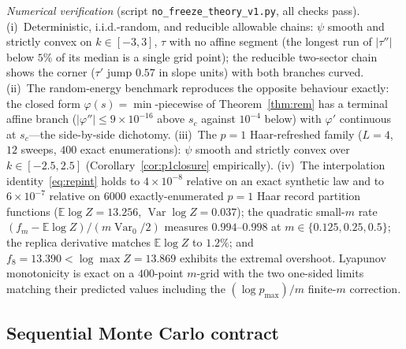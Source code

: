 \documentclass[aps,prx,reprint,superscriptaddress,nobibnotes,longbibliography]{revtex4-2}
\theoremstyle{remark}
\newcommand{\E}{\mathbb E}
\begin{document}
\emph{Numerical verification} (script \texttt{no\_freeze\_theory\_v1.py},
all checks pass).  (i)~Deterministic, i.i.d.-random, and reducible
allowable chains: $\psi$ smooth and strictly convex on
$k\in[-3,3]$, $\tau$ with no affine segment (the longest run of
$|\tau''|$ below $5\%$ of its median is a single grid point); the
reducible two-sector chain shows the corner ($\tau'$ jump $0.57$ in slope
units) with both branches curved.  (ii)~The random-energy benchmark
reproduces the opposite behaviour exactly: the closed form
$\varphi(s)=\min$-piecewise of Theorem~\ref{thm:rem} has a terminal
affine branch ($|\varphi''|\le9\times10^{-16}$ above $s_c$ against
$10^{-4}$ below) with $\varphi'$ continuous at $s_c$---the side-by-side
dichotomy.  (iii)~The $p=1$ Haar-refreshed family ($L=4$, $12$ sweeps,
$400$ exact enumerations): $\psi$ smooth and strictly convex over
$k\in[-2.5,2.5]$ (Corollary~\ref{cor:p1closure} empirically).  (iv)~The
interpolation identity~\eqref{eq:repint} holds to $4\times10^{-8}$
relative on an exact synthetic law and to $6\times10^{-7}$ relative on
$6000$ exactly-enumerated $p=1$ Haar record partition functions
($\E\log Z=13.256$, $\operatorname{Var}\log Z=0.037$); the quadratic small-$m$ rate
$(f_m-\E\log Z)/(m\operatorname{Var}_0/2)$ measures $0.994$--$0.998$ at
$m\in\{0.125,0.25,0.5\}$; the replica derivative matches $\E\log Z$ to
$1.2\%$; and $f_8=13.390<\log\max Z=13.869$ exhibits the extremal
overshoot.  Lyapunov monotonicity is exact on a $400$-point $m$-grid with
the two one-sided limits matching their predicted values including the
$(\log p_{\max})/m$ finite-$m$ correction.

\subsection{Sequential Monte Carlo contract}
\end{document}
